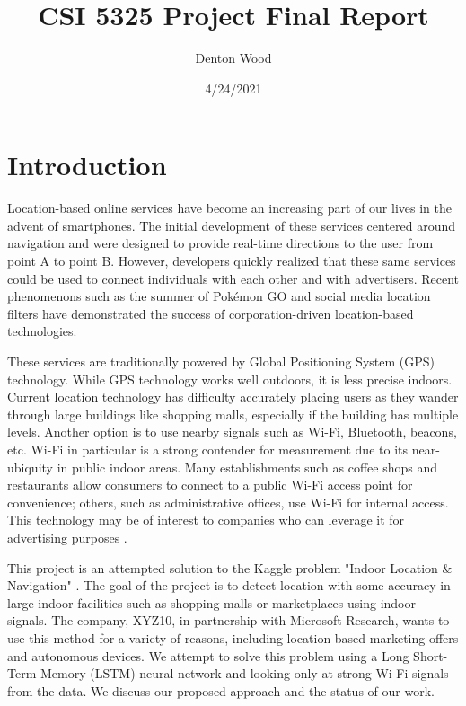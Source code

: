 \documentclass[a4paper]{article}
\title{CSI 5325 Project Final Report}
\author{Denton Wood}
\date{4/24/2021}
\begin{document}
\lstset{language=Python}

\maketitle

\section{Introduction}

Location-based online services have become an increasing part of our lives in the advent of smartphones. The initial development of these services centered around navigation and were designed to provide real-time directions to the user from point A to point B. However, developers quickly realized that these same services could be used to connect individuals with each other and with advertisers. Recent phenomenons such as the summer of Pokémon GO \cite{zsila_empirical_2018} and social media location filters \cite{lubbers_stories_2018} have demonstrated the success of corporation-driven location-based technologies.

These services are traditionally powered by Global Positioning System (GPS) technology. While GPS technology works well outdoors, it is less precise indoors. Current location technology has difficulty accurately placing users as they wander through large buildings like shopping malls, especially if the building has multiple levels. Another option is to use nearby signals such as Wi-Fi, Bluetooth, beacons, etc. Wi-Fi in particular is a strong contender for measurement due to its near-ubiquity in public indoor areas. Many establishments such as coffee shops and restaurants allow consumers to connect to a public Wi-Fi access point for convenience; others, such as administrative offices, use Wi-Fi for internal access. This technology may be of interest to companies who can leverage it for advertising purposes \cite{bues_how_2017}.

This project is an attempted solution to the Kaggle problem "Indoor Location \& Navigation" \cite{kaggle_indoor}. The goal of the project is to detect location with some accuracy in large indoor facilities such as shopping malls or marketplaces using indoor signals. The company, XYZ10, in partnership with Microsoft Research, wants to use this method for a variety of reasons, including location-based marketing offers and autonomous devices. We attempt to solve this problem using a Long Short-Term Memory (LSTM) neural network and looking only at strong Wi-Fi signals from the data. We discuss our proposed approach and the status of our work.
\end{document}
